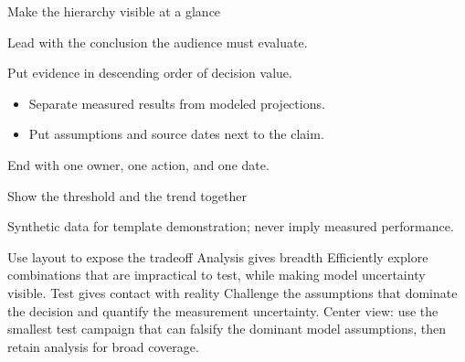 \documentclass[aspectratio=169,professionalfonts]{beamer}
\begin{document}
\begin{frame}{Make the hierarchy visible at a glance}
  \begin{LSBullets}
    \item Lead with the conclusion the audience must evaluate.
    \item Put evidence in descending order of decision value.
      \begin{itemize}
        \item Separate measured results from modeled projections.
        \item Put assumptions and source dates next to the claim.
      \end{itemize}
    \item End with one owner, one action, and one date.
  \end{LSBullets}
\end{frame}

\begin{frame}{Show the threshold and the trend together}
  \centering
  \par\vspace{0.08in}
  {\fontsize{14}{17}\selectfont\color{LSDeckOffWhite}
  Synthetic data for template demonstration; never imply measured performance.\par}
\end{frame}

\LSDecisionSlide
  {Use layout to expose the tradeoff}
  {Analysis gives breadth}
  {Efficiently explore combinations that are impractical to test, while making
   model uncertainty visible.}
  {Test gives contact with reality}
  {Challenge the assumptions that dominate the decision and quantify the
   measurement uncertainty.}
  {Center view: use the smallest test campaign that can falsify the dominant
   model assumptions, then retain analysis for broad coverage.}
\end{document}
